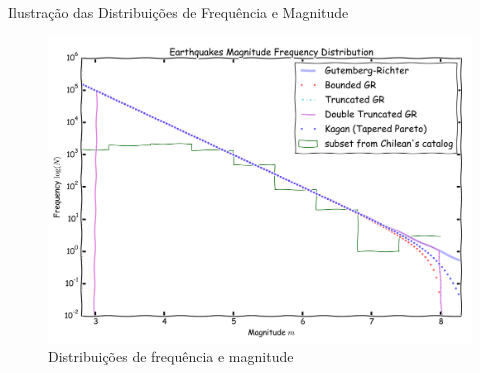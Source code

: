 \documentclass[ucs,8pt]{beamer}
\begin{document}
\begin{frame}{Ilustração das Distribuições de Frequência e Magnitude}
\begin{figure}[H]
   \centering
   \includegraphics[height=0.90\textheight]{mfd}
   \caption[Distribuições de frequência e magnitude]
   		   {Distribuições de frequência e magnitude} 
   \label{f:mfd}
\end{figure} 
\end{frame}
\end{document}
